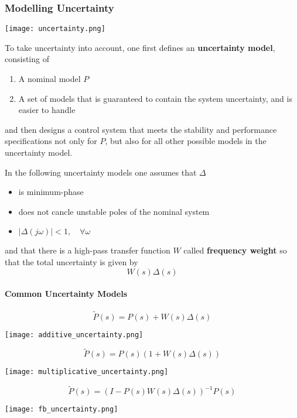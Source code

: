 \subsubsection{Modelling Uncertainty}
\begin{center}
    \texttt{[image: uncertainty.png]}
\end{center}
To take uncertainty into account, one first defines an \textbf{uncertainty model}, consisting of
\begin{enumerate}
    \item A nominal model $P$
    \item A set of models that is guaranteed to contain the system uncertainty, and is easier to handle
\end{enumerate}
and then designs a control system that meets the stability and performance specifications not only for $P$, but also for all other possible models in the uncertainty model.


In the following uncertainty models one assumes that $\Delta$
\begin{itemize}
    \item is minimum-phase
    \item does not cancle unstable poles of the nominal system
    \item $|\Delta(j\omega)|<1,\quad\forall\omega$
\end{itemize}
and that there is a high-pass transfer function $W$ called \textbf{frequency weight} so that the total uncertainty is given by
\begin{equation*}
    W(s)\Delta(s)
\end{equation*}

\paragraph{Common Uncertainty Models}
\begin{equation*}
    \tilde{P}(s)=P(s)+W(s)\Delta(s)
\end{equation*}
\begin{center}
    \texttt{[image: additive\_uncertainty.png]}
\end{center}

\begin{equation*}
    \tilde{P}(s)=P(s)(1+W(s)\Delta(s))
\end{equation*}
\begin{center}
    \texttt{[image: multiplicative\_uncertainty.png]}
\end{center}
\begin{equation*}
    \tilde{P}(s)=(I-P(s)W(s)\Delta(s))^{-1}P(s)
\end{equation*}
\begin{center}
    \texttt{[image: fb\_uncertainty.png]}
\end{center}

